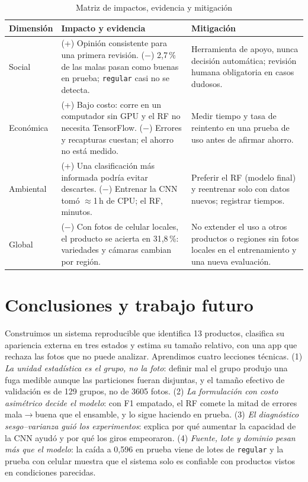 \documentclass[conference]{IEEEtran}
\newcommand{\cls}[1]{\texttt{#1}}
\newcommand{\mb}{mala$\to$buena}
\begin{document}
\begin{table}[t]
\caption{Matriz de impactos, evidencia y mitigación}
\label{tab:impactos}
\centering
\scriptsize
\setlength{\tabcolsep}{3pt}
\begin{tabular}{@{}>{\raggedright\arraybackslash}p{}>{\raggedright\arraybackslash}p{}>{\raggedright\arraybackslash}p{}@{}}
\toprule
Dimensión & Impacto y evidencia & Mitigación\\
\midrule
Social & (+) Opinión consistente para una primera revisión. ($-$) 2,7\,\% de las malas pasan como buenas en prueba; \cls{regular} casi no se detecta. & Herramienta de apoyo, nunca decisión automática; revisión humana obligatoria en casos dudosos.\\
Económica & (+) Bajo costo: corre en un computador sin GPU y el RF no necesita TensorFlow. ($-$) Errores y recapturas cuestan; el ahorro no está medido. & Medir tiempo y tasa de reintento en una prueba de uso antes de afirmar ahorro.\\
Ambiental & (+) Una clasificación más informada podría evitar descartes. ($-$) Entrenar la CNN tomó $\approx$1\,h de CPU; el RF, minutos. & Preferir el RF (modelo final) y reentrenar solo con datos nuevos; registrar tiempos.\\
Global & ($-$) Con fotos de celular locales, el producto se acierta en 31,8\,\%: variedades y cámaras cambian por región. & No extender el uso a otros productos o regiones sin fotos locales en el entrenamiento y una nueva evaluación.\\
\bottomrule
\end{tabular}
\end{table}

\section{Conclusiones y trabajo futuro}

Construimos un sistema reproducible que identifica 13 productos, clasifica su apariencia externa en tres estados y estima su tamaño relativo, con una app que rechaza las fotos que no puede analizar. Aprendimos cuatro lecciones técnicas. (1) \emph{La unidad estadística es el grupo, no la foto}: definir mal el grupo produjo una fuga medible aunque las particiones fueran disjuntas, y el tamaño efectivo de validación es de 129 grupos, no de 3605 fotos. (2) \emph{La formulación con costo asimétrico decide el modelo}: con F1 empatado, el RF comete la mitad de errores \mb{} que el ensamble, y lo sigue haciendo en prueba. (3) \emph{El diagnóstico sesgo--varianza guió los experimentos}: explica por qué aumentar la capacidad de la CNN ayudó y por qué los giros empeoraron. (4) \emph{Fuente, lote y dominio pesan más que el modelo}: la caída a 0,596 en prueba viene de lotes de \cls{regular} y la prueba con celular muestra que el sistema solo es confiable con productos vistos en condiciones parecidas.
\end{document}
